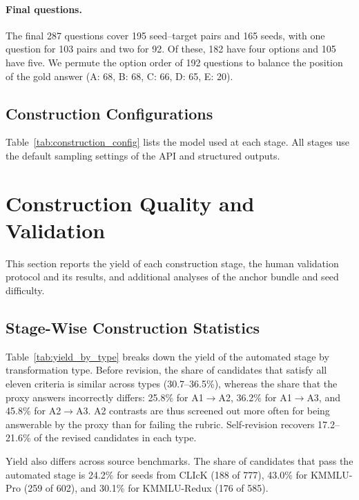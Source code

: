 \paragraph{Final questions.}
The final 287 questions cover 195 seed--target pairs and 165 seeds, with one question for 103 pairs and two for 92.
Of these, 182 have four options and 105 have five.
We permute the option order of 192 questions to balance the position of the gold answer (A: 68, B: 68, C: 66, D: 65, E: 20).

\subsection{Construction Configurations}

Table~\ref{tab:construction_config} lists the model used at each stage.
All stages use the default sampling settings of the API and structured outputs.



\section{Construction Quality and Validation}
\label{app:construction_quality}

This section reports the yield of each construction stage, the human validation protocol and its results, and additional analyses of the anchor bundle and seed difficulty.

\subsection{Stage-Wise Construction Statistics}

Table~\ref{tab:yield_by_type} breaks down the yield of the automated stage by transformation type.
Before revision, the share of candidates that satisfy all eleven criteria is similar across types (30.7--36.5\%), whereas the share that the proxy answers incorrectly differs: 25.8\% for A1$\rightarrow$A2, 36.2\% for A1$\rightarrow$A3, and 45.8\% for A2$\rightarrow$A3.
A2 contrasts are thus screened out more often for being answerable by the proxy than for failing the rubric.
Self-revision recovers 17.2--21.6\% of the revised candidates in each type.



Yield also differs across source benchmarks.
The share of candidates that pass the automated stage is 24.2\% for seeds from CLIcK (188 of 777), 43.0\% for KMMLU-Pro (259 of 602), and 30.1\% for KMMLU-Redux (176 of 585).

